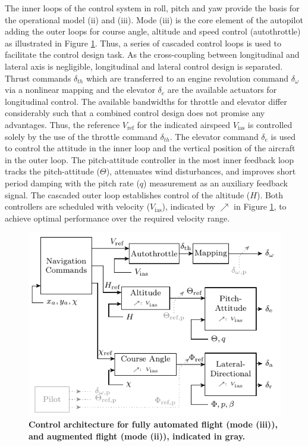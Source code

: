 \documentclass[aerospace,article,submit,moreauthors,pdftex,10pt,a4paper]{Definitions/mdpi}
\begin{document}
The inner loops of the control system in roll, pitch and yaw provide the basis for the operational model (ii) and (iii). Mode (iii) is the core element of the autopilot  adding the outer loops for course angle, altitude and speed control (autothrottle) as illustrated in Figure \ref{fig:arch}. Thus, a series of cascaded control loops is used to facilitate the control design task. As the cross-coupling between longitudinal and lateral axis is negligible, longitudinal and lateral control design is separated.  Thrust commands $\delta_{th}$ which are transferred to an engine revolution command $\delta_{\omega}$ via a nonlinear mapping and the  elevator $\delta_e$ are the available actuators for longitudinal control.
The available bandwidths for throttle and elevator differ considerably such that a combined control design does not promise any advantages. Thus, the reference $V_{\text{ref}}$ for the indicated airspeed $V_{\text{ias}}$ is controlled solely by the use of the throttle command  $\delta_{th}$. The elevator command  $\delta_{e}$ is used to control the attitude in the inner loop and the vertical position of the aircraft in the outer loop. The pitch-attitude controller in the most inner feedback loop tracks the pitch-attitude ($\Theta$), attenuates wind disturbances, and improves short period damping with the pitch rate ($q$) measurement as an auxiliary feedback signal. The cascaded outer loop establishes control of the altitude ($H$). Both controllers are scheduled with velocity ($V_{\text{ias}}$), indicated by $\nearrow$ in Figure \ref{fig:arch}, to achieve optimal performance over the required velocity range.

\begin{figure}[!htbp]	
	\centering
	\includegraphics[width=0.7\linewidth]{figs/architecture.pdf}
	\caption{\textbf{Control architecture for fully automated flight (mode (iii)), and augmented flight (mode (ii)), indicated in gray.}}
	\label{fig:arch}
\end{figure}
\end{document}
